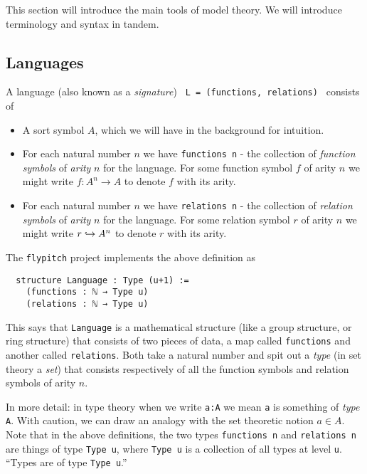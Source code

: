 This section will introduce the main tools of model theory.
We will introduce  terminology and syntax in tandem.

\subsection{Languages}
\begin{dfn}[Language]
  A language (also known as a \textit{signature}) \texttt{ L = (functions, relations) } consists of

  \begin{itemize}
    \item A sort symbol $A$, which we will have in the background for intuition.
    \item For each natural number $n$ we have \texttt{functions n} -
          the collection of \textit{function symbols} of \textit{arity} $n$ for the language.
          For some function symbol $f$ of arity $n$ we might write
          $f : A^{n} \to A$ to denote $f$ with its arity.
    \item For each natural number $n$ we have \texttt{relations n} -
          the collection of \textit{relation symbols} of \textit{arity} $n$ for the language.
          For some relation symbol $r$ of arity $n$ we might write
          $r \hookrightarrow A^{n}$ to denote $r$ with its arity.
  \end{itemize}

  The \texttt{flypitch} project implements the above definition as

  \begin{lstlisting}
  structure Language : Type (u+1) :=
    (functions : ℕ → Type u)
    (relations : ℕ → Type u)\end{lstlisting}

  This says that \texttt{Language} is a mathematical structure
  (like a group structure, or ring structure)
  that consists of two pieces of data,
  a map called \texttt{functions} and another called \texttt{relations}.
  Both take a natural number and spit out a \textit{type}
  (in set theory a \textit{set})
  that consists respectively of all the function symbols and relation symbols
  of arity $n$.

  In more detail: in type theory when we write \texttt{a:A} we mean \texttt{a} is something
  of \textit{type} \texttt{A}.
  With caution, we can draw an analogy with the set theoretic notion $a \in A$.
  Note that in the above definitions, the two types
  \texttt{functions n} and \texttt{relations n} are things of type \texttt{Type u},
  where \texttt{Type u} is a collection of all types at level \texttt{u}.
  ``Types are of type \texttt{Type u}.''


\end{dfn}

